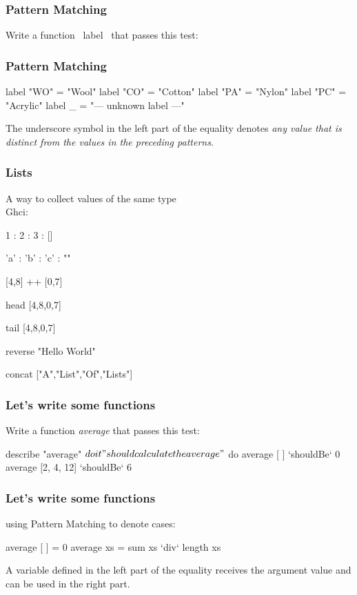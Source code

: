 \documentclass[12pt,xcolor={dvipsnames}]{beamer}
\newcommand{\tc}{\textcolor}
\newcommand{\key}[1]{\tc{orange}{#1}}
\newcommand{\rk}{\enskip{\key{$\hookleftarrow$}}}
\newcommand{\vs}{\vspace{1em}}
\begin{document}
\begin{frame}[fragile]
\frametitle{Pattern Matching}
Write a function ~label~ that passes this test:
\end{frame}
\begin{frame}[fragile]
\frametitle{Pattern Matching}
\begin{haskell}
label "WO" = "Wool"
label "CO" = "Cotton"
label "PA" = "Nylon"
label "PC" = "Acrylic"
label   _  = "--- unknown label ---"
\end{haskell}
The underscore symbol in the left part of the equality denotes \emph{any value that is distinct from the values in the preceding patterns}.
\end{frame}
\begin{frame}[fragile]
\frametitle{Lists}
A way to collect values of the same type\\
Ghci:
\begin{term}
1 : 2 : 3 : []\rk

'a' : 'b' : 'c' : ""\rk

[4,8] ++ [0,7]\rk

head [4,8,0,7]\rk

tail [4,8,0,7]\rk

reverse "Hello World"\rk

concat ["A","List","Of","Lists"]\rk
\end{term}
\end{frame}
\begin{frame}[fragile]
\frametitle{Let's write some functions}
Write a function \emph{average} that passes this test:
\vs
\begin{hspec}
    describe "average" $ do
        it "should calculate the average" $ do
            average [ ]        `shouldBe` 0
            average [2, 4, 12] `shouldBe` 6
\end{hspec}
\end{frame}
\begin{frame}[fragile]
\frametitle{Let's write some functions}
using Pattern Matching to denote cases: 
\vs
\begin{haskell}
average [ ]  = 0
average xs   = sum xs `div` length xs
\end{haskell}
\vs
A variable defined in the left part of the equality receives the argument value and can be used in the right part.
\end{frame}
\end{document}
